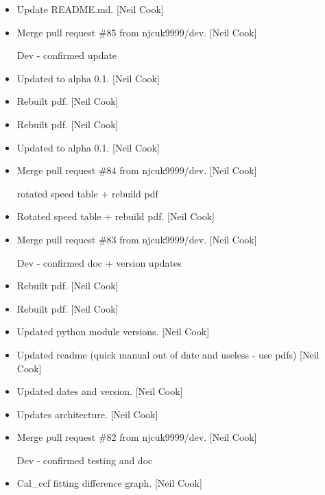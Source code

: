 \documentclass[a4paper,10pt,english]{report}
\begin{document}
\label{\detokenize{misc/changelog:id499}}\begin{itemize}
\item {} 
Update README.md. {[}Neil Cook{]}

\item {} 
Merge pull request \#85 from njcuk9999/dev. {[}Neil Cook{]}

Dev - confirmed update

\item {} 
Updated to alpha 0.1. {[}Neil Cook{]}

\item {} 
Rebuilt pdf. {[}Neil Cook{]}

\item {} 
Rebuilt pdf. {[}Neil Cook{]}

\item {} 
Updated to alpha 0.1. {[}Neil Cook{]}

\item {} 
Merge pull request \#84 from njcuk9999/dev. {[}Neil Cook{]}

rotated speed table + rebuild pdf

\item {} 
Rotated speed table + rebuild pdf. {[}Neil Cook{]}

\item {} 
Merge pull request \#83 from njcuk9999/dev. {[}Neil Cook{]}

Dev - confirmed doc + version updates

\item {} 
Rebuilt pdf. {[}Neil Cook{]}

\item {} 
Rebuilt pdf. {[}Neil Cook{]}

\item {} 
Updated python module versions. {[}Neil Cook{]}

\item {} 
Updated readme (quick manual out of date and useless - use pdfs) {[}Neil
Cook{]}

\item {} 
Updated dates and version. {[}Neil Cook{]}

\item {} 
Updates architecture. {[}Neil Cook{]}

\item {} 
Merge pull request \#82 from njcuk9999/dev. {[}Neil Cook{]}

Dev - confirmed testing and doc

\item {} 
Cal\_ccf fitting difference graph. {[}Neil Cook{]}


\end{itemize}
\end{document}
